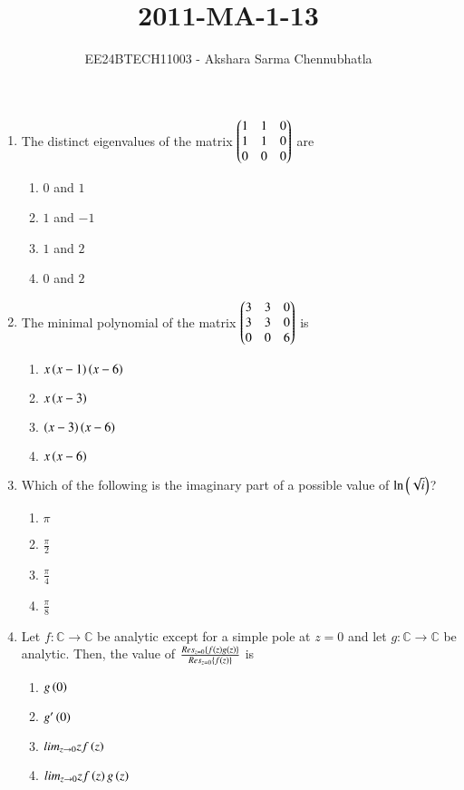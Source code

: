 \documentclass[journal,12pt,onecolumn]{IEEEtran}
\theoremstyle{remark}
\begin{document}

\title{2011-MA-1-13}
\author{EE24BTECH11003 - Akshara Sarma Chennubhatla%
}
\maketitle
\begin{enumerate}

\item The distinct eigenvalues of the matrix
$\begin{pmatrix}1 & 1 & 0\\1 & 1 & 0\\0 & 0 & 0\end{pmatrix}$ are
\begin{enumerate}
\item $0$ and $1$
\item $1$ and $-1$
\item $1$ and $2$
\item $0$ and $2$
\end{enumerate}

\item The minimal polynomial of the matrix
$\begin{pmatrix}3 & 3 & 0\\3 & 3 & 0\\0 & 0 & 6\end{pmatrix}$ is
\begin{enumerate}
\item $x\left(x-1\right)\left(x-6\right)$
\item $x\left(x-3\right)$
\item $\left(x-3\right)\left(x-6\right)$
\item $x\left(x-6\right)$
\end{enumerate}

\item Which of the following is the imaginary part of a possible value of $\ln \left(\sqrt{i}\right)$?
\begin{enumerate}
\item $\pi$
\item $\frac{\pi}{2}$
\item $\frac{\pi}{4}$
\item $\frac{\pi}{8}$
\end{enumerate}

\item Let $f\colon \mathbb{C} \to \mathbb{C}$ be analytic except for a simple pole at $z=0$ and let $g\colon \mathbb{C} \to \mathbb{C}$ be analytic. Then, the value of $\frac{Res_{z=0}\left\{f\left(z\right)g\left(z\right)\right\}}{Res_{z=0}\left\{f\left(z\right)\right\}}$ is
\begin{enumerate}
\item $g\left(0\right)$
\item $g'\left(0\right)$
\item $lim_{z \to 0} zf\left(z\right)$
\item $lim_{z \to 0} zf\left(z\right)g\left(z\right)$
\end{enumerate}


\end{enumerate}
\end{document}
